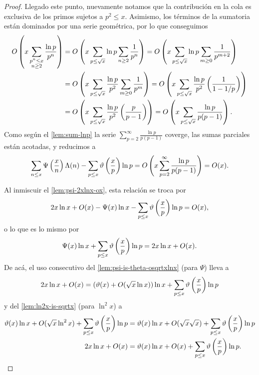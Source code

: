 \begin{proof}
  Llegado este punto, nuevamente notamos que la contribuci\'on
  en la cola es exclusiva de los primos sujetos a \(p^2 \le x\).
  Asimismo, los t\'erminos de la sumatoria est\'an dominados por una serie geom\'etrica,
  por lo que conseguimos
  \begin{align*}
    O\left( x \sum_{\substack{p^n \leq x \\ n \geq 2}} \frac{\ln p}{p^n} \right)
    &= O\left( x \sum_{p \leq \sqrt{x}} \ln p \sum_{n \geq 2} \frac{1}{p^n} \right)
    = O\left( x \sum_{p \leq \sqrt{x}} \ln p \sum_{m \geq 0} \frac{1}{p^{m + 2}} \right) \\
    &= O\left( x \sum_{p \leq \sqrt{x}} \frac{\ln p}{p^2} \sum_{m \geq 0} \frac{1}{p^m} \right)
    = O\left( x \sum_{p \leq \sqrt{x}} \frac{\ln p}{p^2} \left( \frac{1}{1 - 1/p} \right) \right) \\
    &= O\left( x \sum_{p \leq \sqrt{x}} \frac{\ln p}{p^2} \left( \frac{p}{p - 1} \right) \right)
    = O\left( x \sum_{p \leq \sqrt{x}} \frac{\ln p}{p (p - 1)} \right).
  \end{align*}
  Como seg\'un el \cref{lem:sum-lnp} la serie
  \(\displaystyle{\sum_{p = 2}^{\infty} \frac{\ln p}{p (p - 1)}}\) coverge,
  las sumas parciales est\'an acotadas,
  y reducimos a
  \[
    \sum_{n \leq x} \Psi\left( \frac{x}{n} \right)\Lambda(n)
    - \sum_{p \leq x} \vartheta\left( \frac{x}{p} \right) \ln p
    = O\left( x \sum_{p = 2}^\infty \frac{\ln p}{p (p - 1)} \right)
    = O(x).
  \]
  
  Al inmiscuir el \cref{lem:psi-2xlnx-ox}, esta relaci\'on se troca por
  \[
    2x\ln x + O(x) - \Psi(x)\ln x
    - \sum_{p \leq x} \vartheta\left( \frac{x}{p} \right)\ln p = O(x),
  \]
  o lo que es lo mismo por
  \[
    \Psi(x)\ln x + \sum_{p \leq x} \vartheta\left( \frac{x}{p} \right)\ln p = 2x\ln x + O(x).
  \]
  De ac\'a, el uso consecutivo del
  \cref{lem:psi-is-theta-osqrtxlnx} (para \(\Psi\)) lleva a
  \[
    2x\ln x + O(x)
    = (\vartheta(x) + O(\sqrt{x}\ln x))\ln x +
    \sum_{p \leq x} \vartheta\left( \frac{x}{p} \right)\ln p \\  
  \]
  y del \cref{lem:ln2x-is-sqrtx} (para \(\ln^2 x\)) a
  \begin{align*}
    \vartheta(x)\ln x + O(\sqrt{x}\ln^2 x) + \sum_{p \leq x} \vartheta\left( \frac{x}{p} \right)\ln p
    &= \vartheta(x)\ln x + O(\sqrt{x}\sqrt{x}) + \sum_{p \leq x} \vartheta\left( \frac{x}{p} \right)\ln p \\
    2x\ln x + O(x)
    &= \vartheta(x)\ln x + O(x) + \sum_{p \leq x} \vartheta\left( \frac{x}{p} \right)\ln p.
  \end{align*}
\end{proof}

